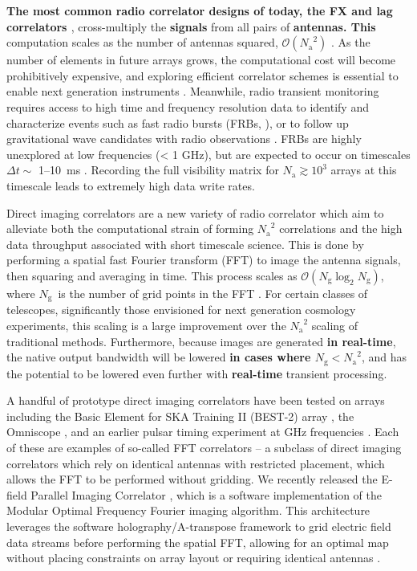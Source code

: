 \documentclass[a4paper,fleqn,usenatbib]{../mnras}
\newcommand{\Nant}{\ensuremath{N_{\mathrm{a}}}}
\newcommand{\Ng}{\ensuremath{N_{\mathrm{g}}}}
\begin{document}
\textbf{The most common radio correlator designs of today, the FX and lag correlators \citep{rom99}},
cross-multiply the \textbf{signals} from all pairs of \textbf{antennas.
This} computation scales as the number of antennas squared, $\mathcal{O}(\Nant^2)$ 
\citep{bun04}. As the number of elements in future arrays grows, the computational cost will 
become prohibitively expensive, and exploring efficient correlator schemes is essential to 
enable next generation instruments \citep{lon00}. Meanwhile, radio transient monitoring 
requires access to high time and frequency resolution data to identify and characterize events 
such as fast radio bursts (FRBs, \citealt{lor07}), or to follow up gravitational wave candidates 
with radio observations \citep{abb16a,abb16b}. FRBs are highly unexplored at low frequencies 
(< 1 GHz), but are expected to occur on timescales $\Delta t \sim$ 1--10~ms \citep{tho13}. 
Recording the full visibility matrix for $\Nant \gtrsim 10^3$ arrays at this timescale leads to 
extremely high data write rates. 

Direct imaging correlators are a new variety of radio correlator which aim to alleviate both the 
computational strain of forming $\Nant^2$ correlations and the high data throughput associated 
with short timescale science. This is done by performing a spatial fast Fourier transform (FFT) 
to image the antenna signals, then squaring and averaging in time. This process scales as 
$\mathcal{O}(\Ng \log_2 \Ng)$, where \Ng~is the number of grid points in the FFT \citep{mor11,
 teg09, teg10}. For certain classes of telescopes, significantly those envisioned for next 
 generation cosmology experiments, this scaling is a large improvement over the $\Nant^2$ 
 scaling of traditional methods. Furthermore, because images are generated \textbf{in real-time}, the native 
 output bandwidth will be lowered \textbf{in cases where $\Ng < \Nant^2$}, and has the potential to be 
 lowered even further with \textbf{real-time} transient processing.

A handful of prototype direct imaging correlators have been tested on arrays including the 
Basic Element for SKA Training II (BEST-2) array \citep{fos14}, the Omniscope \citep{zhe14}, 
and an earlier pulsar timing experiment at GHz frequencies \citep{oto94, dai00}. Each of these 
are examples of so-called FFT correlators -- a subclass of direct imaging correlators which rely 
on identical antennas with restricted placement, which allows the FFT to be performed without 
gridding. We recently released the E-field Parallel Imaging Correlator \citep[EPIC;][]{thy15c}, 
which is a software implementation of the Modular Optimal Frequency Fourier \citep[MOFF;][]
{mor11} imaging algorithm. This architecture leverages the software holography/A-transpose 
framework to grid electric field data streams before performing the spatial FFT, allowing for an 
optimal map without placing constraints on array layout or requiring identical antennas 
\citep{mor09,bha08,teg97a}.
\end{document}
